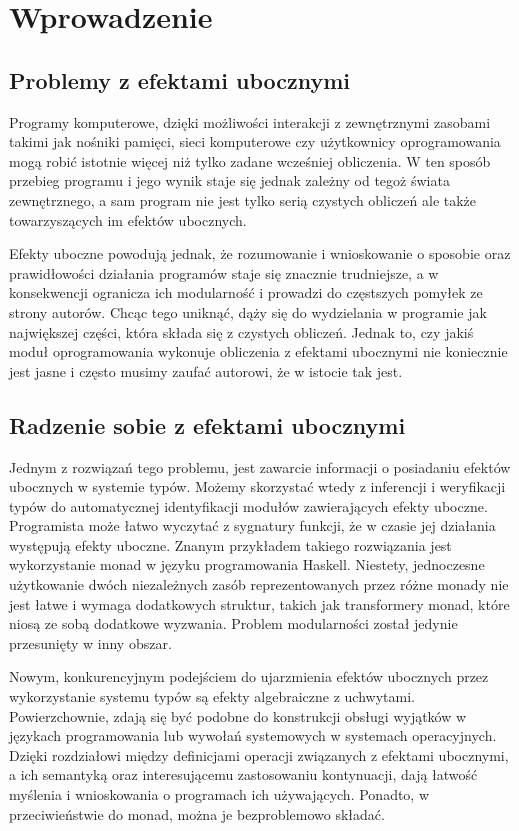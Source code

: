 \documentclass[shortabstract]{iithesis}
\author         {Jakub Mendyk}
\date          {4 września 2020}                     %
\begin{document}

\chapter{Wprowadzenie}

\section{Problemy z efektami ubocznymi}

Programy komputerowe, dzięki możliwości interakcji z zewnętrznymi zasobami takimi jak nośniki pamięci, sieci komputerowe czy użytkownicy oprogramowania mogą robić istotnie więcej niż tylko zadane wcześniej obliczenia. W ten sposób przebieg programu i jego wynik staje się jednak zależny od tegoż świata zewnętrznego, a sam program nie jest tylko serią czystych obliczeń ale także towarzyszących im efektów ubocznych.

Efekty uboczne powodują jednak, że rozumowanie i wnioskowanie o sposobie oraz prawidłowości działania programów staje się znacznie trudniejsze, a w konsekwencji ogranicza ich modularność i prowadzi do częstszych pomyłek ze strony autorów. Chcąc tego uniknąć, dąży się do wydzielania w programie jak największej części, która składa się z czystych obliczeń. Jednak to, czy jakiś moduł oprogramowania wykonuje obliczenia z efektami ubocznymi nie koniecznie jest jasne i często musimy zaufać autorowi, że w istocie tak jest.

\section{Radzenie sobie z efektami ubocznymi}

Jednym z rozwiązań tego problemu, jest zawarcie informacji o posiadaniu efektów ubocznych w systemie typów. Możemy skorzystać wtedy z inferencji i weryfikacji typów do automatycznej identyfikacji modułów zawierających efekty uboczne. Programista może łatwo wyczytać z sygnatury funkcji, że w czasie jej działania występują efekty uboczne. Znanym przykładem takiego rozwiązania jest wykorzystanie monad w języku programowania Haskell. Niestety, jednoczesne użytkowanie dwóch niezależnych zasób reprezentowanych przez różne monady nie jest łatwe i wymaga dodatkowych struktur, takich jak transformery monad, które niosą ze sobą dodatkowe wyzwania. Problem modularności został jedynie przesunięty w inny obszar.

Nowym, konkurencyjnym podejściem do ujarzmienia efektów ubocznych przez wykorzystanie systemu typów są efekty algebraiczne z uchwytami. Powierzchownie, zdają się być podobne do konstrukcji obsługi wyjątków w językach programowania lub wywołań systemowych w systemach operacyjnych. Dzięki rozdziałowi między definicjami operacji związanych z efektami ubocznymi, a ich semantyką oraz interesującemu zastosowaniu kontynuacji, dają łatwość myślenia i wnioskowania o programach ich używających. Ponadto, w przeciwieństwie do monad, można je bezproblemowo składać.
\end{document}
